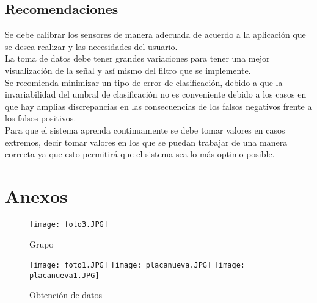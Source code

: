 \documentclass[10pt,a4paper]{article}
\begin{document}
\subsection{Recomendaciones}

Se debe calibrar los sensores de manera adecuada de acuerdo a la aplicación que se desea realizar y las necesidades del usuario.\\

La toma de datos debe tener grandes variaciones para tener una mejor visualización de la señal y así mismo del filtro que se implemente. \\

Se recomienda minimizar un tipo de error de clasificación, debido a que la invariabilidad del umbral de clasificación no es conveniente debido a los casos en que hay amplias discrepancias en las consecuencias de los falsos negativos frente a los falsos positivos.\\

Para que el sistema aprenda continuamente se debe tomar valores en casos extremos, decir tomar valores en los que se puedan trabajar de una manera correcta ya que esto permitirá que el sistema sea lo más optimo posible.\\

\section{Anexos}

\begin{figure}[H]
\centering
\texttt{[image: foto3.JPG]}
 \caption{Grupo} 
\end{figure} 

\begin{figure}[H]
\centering
\texttt{[image: foto1.JPG]}
\texttt{[image: placanueva.JPG]}
\texttt{[image: placanueva1.JPG]}
 \caption{Obtención de datos} 
\end{figure} 


\end{document}
